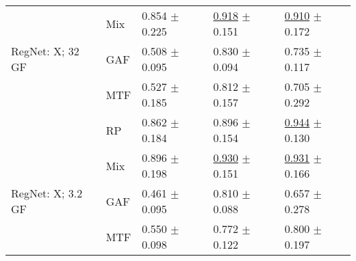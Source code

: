 \begin{tabular}[t]{lllll}
 & Mix & \textcolor[rgb]{0.1213235294,0.5000000000,0}{0.854} $\pm$ \textcolor[rgb]{0.8044733801,0.1955266199,0}{0.225} & \underline{\textcolor[rgb]{0.1235059761,0.5000000000,0}{0.918}} $\pm$ \textcolor[rgb]{0.5014751378,0.4985248622,0}{0.151} & \underline{\textcolor[rgb]{0.1865183246,0.5000000000,0}{0.910}} $\pm$ \textcolor[rgb]{0.3489762354,0.5000000000,0}{0.172} \\
RegNet: X; 32 GF & GAF & \textcolor[rgb]{0.7941176471,0.2058823529,0}{0.508} $\pm$ \textcolor[rgb]{0.3384023183,0.5000000000,0}{0.095} & \textcolor[rgb]{0.4165157552,0.5000000000,0}{0.830} $\pm$ \textcolor[rgb]{0.1845642668,0.5000000000,0}{0.094} & \textcolor[rgb]{0.7303664921,0.2696335079,0}{0.735} $\pm$ \textcolor[rgb]{0.0793065982,0.5000000000,0}{0.117} \\
 & MTF & \textcolor[rgb]{0.7558823529,0.2441176471,0}{0.527} $\pm$ \textcolor[rgb]{0.6607913145,0.3392086855,0}{0.185} & \textcolor[rgb]{0.4780876494,0.5000000000,0}{0.812} $\pm$ \textcolor[rgb]{0.5338881645,0.4661118355,0}{0.157} & \textcolor[rgb]{0.8246073298,0.1753926702,0}{0.705} $\pm$ \textcolor[rgb]{0.9330630893,0.0669369107,0}{0.292} \\
 & RP & \textcolor[rgb]{0.1051470588,0.5000000000,0}{0.862} $\pm$ \textcolor[rgb]{0.6560512372,0.3439487628,0}{0.184} & \textcolor[rgb]{0.1952191235,0.5000000000,0}{0.896} $\pm$ \textcolor[rgb]{0.5211856654,0.4788143346,0}{0.154} & \underline{\textcolor[rgb]{0.0785340314,0.5000000000,0}{0.944}} $\pm$ \textcolor[rgb]{0.1425478198,0.5000000000,0}{0.130} \\
 & Mix & \textcolor[rgb]{0.0404411765,0.5000000000,0}{0.896} $\pm$ \textcolor[rgb]{0.7085309655,0.2914690345,0}{0.198} & \underline{\textcolor[rgb]{0.0836653386,0.5000000000,0}{0.930}} $\pm$ \textcolor[rgb]{0.5037641267,0.4962358733,0}{0.151} & \underline{\textcolor[rgb]{0.1217277487,0.5000000000,0}{0.931}} $\pm$ \textcolor[rgb]{0.3194008772,0.5000000000,0}{0.166} \\
RegNet: X; 3.2 GF & GAF & \textcolor[rgb]{0.8843137255,0.1156862745,0}{0.461} $\pm$ \textcolor[rgb]{0.3401454464,0.5000000000,0}{0.095} & \textcolor[rgb]{0.4860557769,0.5000000000,0}{0.810} $\pm$ \textcolor[rgb]{0.1521613589,0.5000000000,0}{0.088} & \textcolor[rgb]{0.9712041885,0.0287958115,0}{0.657} $\pm$ \textcolor[rgb]{0.8640492700,0.1359507300,0}{0.278} \\
 & MTF & \textcolor[rgb]{0.7117647059,0.2882352941,0}{0.550} $\pm$ \textcolor[rgb]{0.3491926171,0.5000000000,0}{0.098} & \textcolor[rgb]{0.6119521912,0.3880478088,0}{0.772} $\pm$ \textcolor[rgb]{0.3411929565,0.5000000000,0}{0.122} & \textcolor[rgb]{0.5277486911,0.4722513089,0}{0.800} $\pm$ \textcolor[rgb]{0.4713189562,0.5000000000,0}{0.197} \\

\end{tabular}
